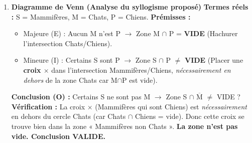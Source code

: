\documentclass[11pt]{article}
\begin{document}
\begin{corrige}
\begin{enumerate}
    \item \textbf{Diagramme de Venn (Analyse du syllogisme proposé)}
    \textbf{Termes réels :} S = Mammifères, M = Chats, P = Chiens.
    \textbf{Prémisses :}
    \begin{itemize}
        \item Majeure (E) : Aucun M n'est P $\rightarrow$ Zone M $\cap$ P = \textbf{VIDE} (Hachurer l'intersection Chats/Chiens).
        \item Mineure (I) : Certains S sont P $\rightarrow$ Zone S $\cap$ P $\neq$ \textbf{VIDE} (Placer une \textbf{croix $\times$} dans l'intersection Mammifères/Chiens, \emph{nécessairement en dehors} de la zone Chats car M$\cap$P est vide).
    \end{itemize}
    \textbf{Conclusion (O) :} Certains S ne sont pas M $\rightarrow$ Zone S $\cap$ $\overline{\text{M}}$ $\neq$ VIDE ?
    \textbf{Vérification :} La croix $\times$ (Mammifères qui sont Chiens) est \emph{nécessairement} en dehors du cercle Chats (car Chats $\cap$ Chiens = vide). Donc cette croix se trouve bien dans la zone « Mammifères non Chats ». \textbf{La zone n'est pas vide. Conclusion VALIDE.}


\end{enumerate}
\end{corrige}
\end{document}
